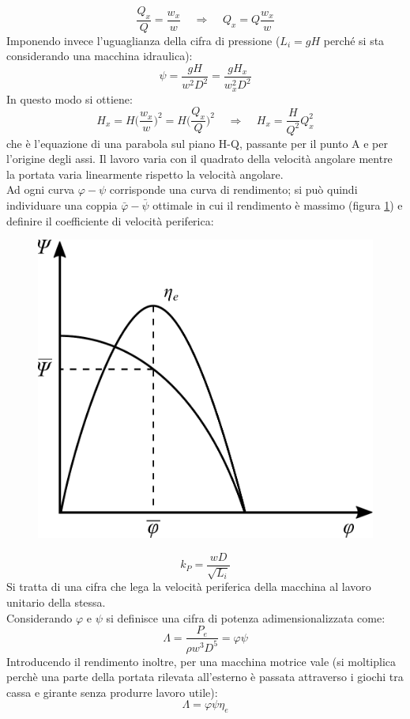 \begin{equation}
\frac{Q_x}{Q}=\frac{w_x}{w} \;\;\;\; \Rightarrow \;\;\;\; Q_x = Q \frac{w_x}{w}
\end{equation}
Imponendo invece l'uguaglianza della cifra di pressione ($L_i=gH$ perché si sta considerando una macchina idraulica):
\begin{equation}
\psi = \frac{gH}{w^2 D^2}= \frac{gH_x}{w_x^2 D^2}
\end{equation}
In questo modo si ottiene:
\begin{equation}
H_x = H\bigg(\frac{w_x}{w}\bigg)^2 = H\bigg(\frac{Q_x}{Q}\bigg)^2 \;\;\;\; \Rightarrow \;\;\;\; H_x = \frac{H}{Q^2}Q_x^2
\end{equation}
che è l'equazione di una parabola sul piano H-Q, passante per il punto A e per l'origine degli assi. Il lavoro varia con il quadrato della velocità angolare mentre la portata varia linearmente rispetto la velocità angolare. \\
Ad ogni curva $\varphi - \psi$ corrisponde una curva di rendimento; si può quindi individuare una coppia $\bar{\varphi} - \bar{\psi}$ ottimale in cui il rendimento è massimo (figura \ref{fig:adim}) e definire il coefficiente di velocità periferica:
\begin{figure}[h!]
\centering
  \includegraphics[width=.3\textwidth]{fig/adim.pdf}
\caption{}
\label{fig:adim}
\end{figure}
\begin{equation}
k_P = \frac{w D}{\sqrt{L_i}}
\end{equation}
Si tratta di una cifra che lega la velocità periferica della macchina al lavoro unitario della stessa.\\
Considerando $\varphi$ e $\psi$ si definisce una cifra di potenza adimensionalizzata come:
\begin{equation}
\Lambda = \frac{P_e}{\rho w^3 D^5} = \varphi \psi
\end{equation}
Introducendo il rendimento inoltre, per una macchina motrice vale (si moltiplica perchè una parte della portata rilevata all'esterno è passata attraverso i giochi tra cassa e girante senza produrre lavoro utile):
\begin{equation}
\Lambda = \varphi \psi \eta_e
\end{equation}
